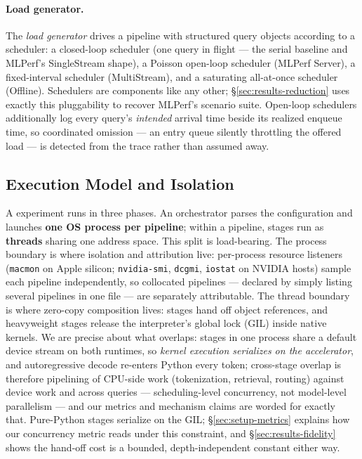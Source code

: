\paragraph{Load generator.} The \emph{load generator} drives a pipeline with
structured query objects according to a scheduler: a closed-loop scheduler
(one query in flight --- the serial baseline and MLPerf's SingleStream
shape), a Poisson open-loop scheduler (MLPerf Server), a fixed-interval
scheduler (MultiStream), and a saturating all-at-once scheduler (Offline).
Schedulers are components like any other; \S\ref{sec:results-reduction} uses exactly
this pluggability to recover MLPerf's scenario suite. Open-loop schedulers
additionally log every query's \emph{intended} arrival time beside its
realized enqueue time, so coordinated omission --- an entry queue silently
throttling the offered load --- is detected from the trace rather than
assumed away.

\subsection{Execution Model and Isolation}
\label{sec:framework-execution}

A \sysname{} experiment runs in three phases. An orchestrator parses the
configuration and launches \textbf{one OS process per pipeline}; within a
pipeline, stages run as \textbf{threads} sharing one address space. This
split is load-bearing. The process boundary is where isolation and
attribution live: per-process resource listeners (\texttt{macmon} on Apple
silicon; \texttt{nvidia-smi}, \texttt{dcgmi}, \texttt{iostat} on NVIDIA
hosts) sample each pipeline independently, so collocated pipelines ---
declared by simply listing several pipelines in one file --- are separately
attributable. The thread boundary is where zero-copy composition lives:
stages hand off object references, and heavyweight stages release the
interpreter's global lock (GIL) inside native kernels. We are precise about
what overlaps: stages in one process share a default device stream on both
runtimes, so \emph{kernel execution serializes on the accelerator}, and
autoregressive decode re-enters Python every token; cross-stage overlap is
therefore pipelining of CPU-side work (tokenization, retrieval, routing)
against device work and across queries --- scheduling-level concurrency,
not model-level parallelism --- and our metrics and mechanism claims are
worded for exactly that. Pure-Python stages serialize on the GIL; \S\ref{sec:setup-metrics} explains how our concurrency
metric reads under this constraint, and \S\ref{sec:results-fidelity} shows the
hand-off cost is a bounded, depth-independent constant either way.

